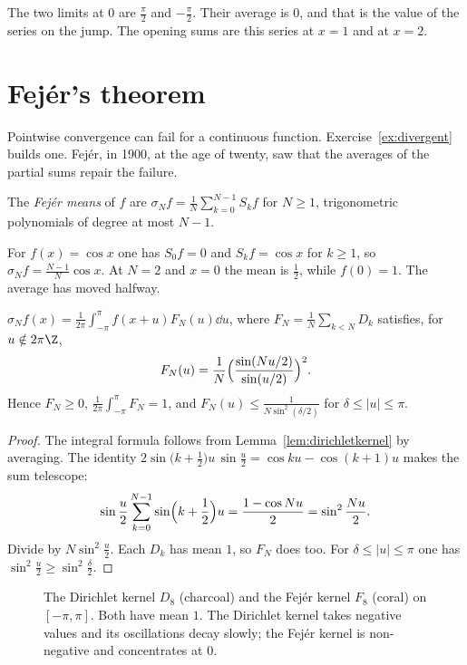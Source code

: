The two limits at $0$ are $\frac\pi2$ and $-\frac\pi2$. Their average is $0$, and that is the value of the series on the jump. The opening sums are this series at $x=1$ and at $x=2$.

\section{Fej\'er's theorem}

Pointwise convergence can fail for a continuous function. Exercise~\ref{ex:divergent} builds one. Fej\'er, in 1900, at the age of twenty, saw that the averages of the partial sums repair the failure.

\begin{definition}
The \emph{Fej\'er means} of $f$ are $\sigma_Nf=\frac1N\sum_{k=0}^{N-1}S_kf$ for $N\ge1$, trigonometric polynomials of degree at most $N-1$.
\end{definition}

For $f(x)=\cos x$ one has $S_0f=0$ and $S_kf=\cos x$ for $k\ge1$, so $\sigma_Nf=\frac{N-1}N\cos x$. At $N=2$ and $x=0$ the mean is $\frac12$, while $f(0)=1$. The average has moved halfway.

\begin{lemma}\label{lem:fejerkernel}
$\sigma_Nf(x)=\frac1{2\pi}\int_{-\pi}^\pi f(x+u)F_N(u)\dd u$, where $F_N=\frac1N\sum_{k<N}D_k$ satisfies, for $u\notin2\pi\Z$,
\[
F_N(u)=\frac1N\Bigl(\frac{\sin(Nu/2)}{\sin(u/2)}\Bigr)^2.
\]
Hence $F_N\ge0$, $\frac1{2\pi}\int_{-\pi}^\pi F_N=1$, and $F_N(u)\le\frac1{N\sin^2(\delta/2)}$ for $\delta\le|u|\le\pi$.
\end{lemma}
\begin{proof}
The integral formula follows from Lemma~\ref{lem:dirichletkernel} by averaging. The identity $2\sin\bigl(k+\frac12\bigr)u\,\sin\frac u2=\cos ku-\cos(k+1)u$ makes the sum telescope:
\[
\sin\frac u2\sum_{k=0}^{N-1}\sin\Bigl(k+\frac12\Bigr)u=\frac{1-\cos Nu}2=\sin^2\frac{Nu}2.
\]
Divide by $N\sin^2\frac u2$. Each $D_k$ has mean $1$, so $F_N$ does too. For $\delta\le|u|\le\pi$ one has $\sin^2\frac u2\ge\sin^2\frac\delta2$.
\end{proof}

\begin{figure}[ht]
\centering
{}
\caption{The Dirichlet kernel $D_8$ (charcoal) and the Fej\'er kernel $F_8$ (coral) on $[-\pi,\pi]$. Both have mean $1$. The Dirichlet kernel
takes negative values and its oscillations decay slowly; the Fej\'er kernel is non-negative and concentrates at $0$.}
\label{fig:kernels}
\end{figure}

